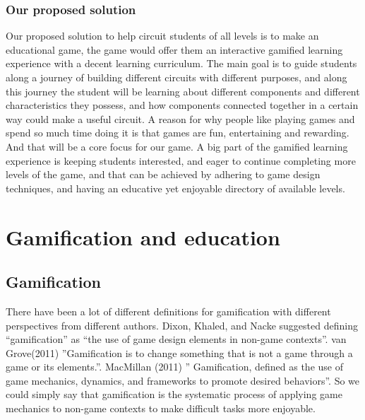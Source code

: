 \documentclass[../main.tex]{subfiles}
\begin{document}
\subsubsection{Our proposed solution}
Our proposed solution to help circuit students of all levels is to make an educational game, the game would offer them an interactive gamified learning experience with a decent learning curriculum. The main goal is to guide students along a journey of building different circuits with different purposes, and along this journey the student will be learning about different components and different characteristics they possess, and how components connected together in a certain way could make a useful circuit.
A reason for why people like playing games and spend so much time doing it is that games are fun, entertaining and rewarding. And that will be a core focus for our game. A big part of the gamified learning experience is keeping students interested, and eager to continue completing more levels of the game, and that can be achieved by adhering to game design techniques, and having an educative yet enjoyable directory of available levels.


\section{Gamification and education}
\subsection{Gamification}
There have been a lot of different definitions for gamification with different perspectives from different authors. Dixon, Khaled, and Nacke suggested defining “gamification” as “the use of game design elements in non-game contexts”. van Grove(2011) \cite{2} ”Gamification is to change something that is not a game through a game or its elements.”. MacMillan (2011) \cite{3} ” Gamification, defined as the use of game mechanics, dynamics, and frameworks to promote desired behaviors”. So we could simply say that gamification is the systematic process of applying game mechanics to non-game contexts to make difficult tasks more enjoyable. 
\end{document}
